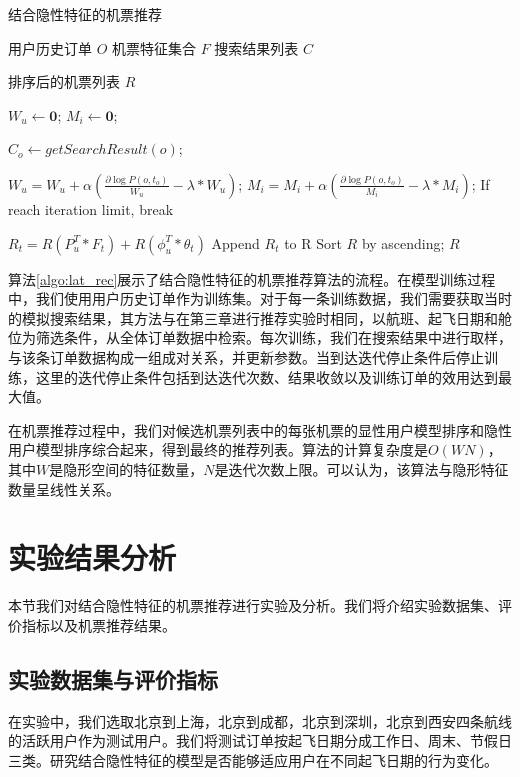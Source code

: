 \begin{algorithm}
\caption{结合隐性特征的机票推荐}
\label{algo:lat_rec}
\begin{algorithmic}[1]
\Require
\Statex 用户历史订单 $O$
\Statex 机票特征集合 $F$
\Statex 搜索结果列表 $C$

\Ensure 
\Statex 排序后的机票列表 $R$

\State $W_u \gets \mathbf{0}$;
\State $M_i \gets \mathbf{0}$;


\State $C_o \gets getSearchResult(o)$;

\State $W_u = W_u + \alpha(\frac{\partial \log P(o,t_o)}{W_u} - \lambda*W_u)$;
\State $M_i = M_i + \alpha(\frac{\partial \log P(o,t_o)}{M_i} - \lambda*M_i)$;
\EndFor
\State If reach iteration limit, break
\EndFor

\State $R_t = R(P_u^T * F_t) + R(\phi_u^T * \theta_t)$
\State Append $R_t$ to R
\EndFor 
\State Sort $R$ by ascending;
\State \Return $R$
\end{algorithmic}
\end{algorithm}

算法\ref{algo:lat_rec}展示了结合隐性特征的机票推荐算法的流程。在模型训练过程中，我们使用用户历史订单作为训练集。对于每一条训练数据，我们需要获取当时的模拟搜索结果，其方法与在第三章进行推荐实验时相同，以航班、起飞日期和舱位为筛选条件，从全体订单数据中检索。每次训练，我们在搜索结果中进行取样，与该条订单数据构成一组成对关系，并更新参数。当到达迭代停止条件后停止训练，这里的迭代停止条件包括到达迭代次数、结果收敛以及训练订单的效用达到最大值。

在机票推荐过程中，我们对候选机票列表中的每张机票的显性用户模型排序和隐性用户模型排序综合起来，得到最终的推荐列表。算法的计算复杂度是$O(WN)$，其中$W$是隐形空间的特征数量，$N$是迭代次数上限。可以认为，该算法与隐形特征数量呈线性关系。


\section{实验结果分析}

本节我们对结合隐性特征的机票推荐进行实验及分析。我们将介绍实验数据集、评价指标以及机票推荐结果。

\subsection{实验数据集与评价指标}
在实验中，我们选取北京到上海，北京到成都，北京到深圳，北京到西安四条航线的活跃用户作为测试用户。我们将测试订单按起飞日期分成工作日、周末、节假日三类。研究结合隐性特征的模型是否能够适应用户在不同起飞日期的行为变化。

